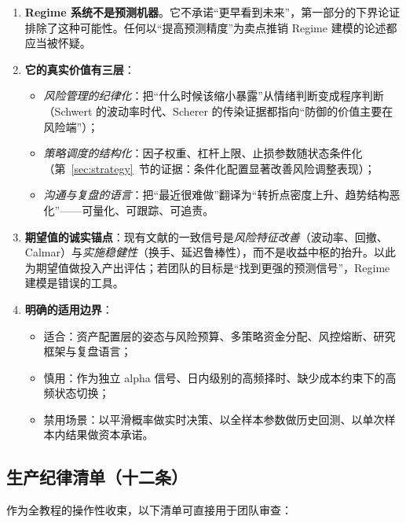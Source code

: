 \begin{enumerate}[itemsep=3pt]
\item \textbf{Regime 系统不是预测机器}。它不承诺“更早看到未来”，第一部分的下界论证排除了这种可能性。任何以“提高预测精度”为卖点推销 Regime 建模的论述都应当被怀疑。
\item \textbf{它的真实价值有三层}：
\begin{itemize}[itemsep=2pt]
\item \emph{风险管理的纪律化}：把“什么时候该缩小暴露”从情绪判断变成程序判断（Schwert 的波动率时代、Scherer 的传染证据都指向“防御的价值主要在风险端”）；
\item \emph{策略调度的结构化}：因子权重、杠杆上限、止损参数随状态条件化（第~\ref{sec:strategy}~节的证据：条件化配置显著改善风险调整表现）；
\item \emph{沟通与复盘的语言}：把“最近很难做”翻译为“转折点密度上升、趋势结构恶化”——可量化、可跟踪、可追责。
\end{itemize}
\item \textbf{期望值的诚实锚点}：现有文献的一致信号是\emph{风险特征改善}（波动率、回撤、Calmar）与\emph{实施稳健性}（换手、延迟鲁棒性），而不是收益中枢的抬升。以此为期望值做投入产出评估；若团队的目标是“找到更强的预测信号”，Regime 建模是错误的工具。
\item \textbf{明确的适用边界}：
\begin{itemize}[itemsep=2pt]
\item 适合：资产配置层的姿态与风险预算、多策略资金分配、风控熔断、研究框架与复盘语言；
\item 慎用：作为独立 alpha 信号、日内级别的高频择时、缺少成本约束下的高频状态切换；
\item 禁用场景：以平滑概率做实时决策、以全样本参数做历史回测、以单次样本内结果做资本承诺。
\end{itemize}
\end{enumerate}

\subsection{生产纪律清单（十二条）}

作为全教程的操作性收束，以下清单可直接用于团队审查：

